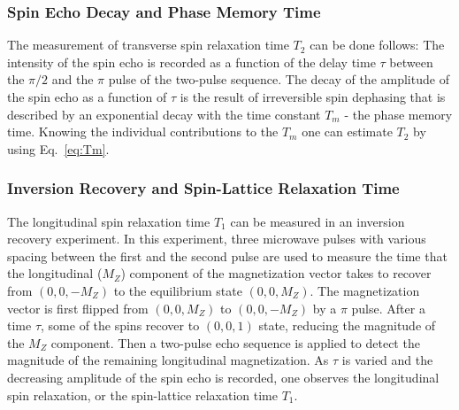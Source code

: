 \subsubsection{Spin Echo Decay and Phase Memory Time}
The measurement of transverse spin relaxation time $T_2$ can be done follows: The intensity of the spin echo is recorded as a function of the delay time $\tau$ between the $\pi/2$ and the $\pi$ pulse of the two-pulse sequence. The decay of the amplitude of the spin echo as a function of $\tau$ is the result of irreversible spin dephasing that is described by an exponential decay with the time constant $T_m$ - the phase memory time. Knowing the individual contributions to the $T_m$ one can estimate $T_2$ by using Eq.~\ref{eq:Tm}.

\subsubsection{Inversion Recovery and Spin-Lattice Relaxation Time}
The longitudinal spin relaxation time $T_1$ can be measured in an inversion recovery experiment. In this experiment, three microwave pulses with various spacing between the first and the second pulse are used to measure the time that the longitudinal ($M_Z$) component of the magnetization vector takes to recover from $(0,0,-M_Z)$ to the equilibrium state $(0,0,M_Z)$. The magnetization vector is first flipped from $(0,0,M_Z)$ to $(0,0,-M_Z)$ by a $\pi$ pulse. After a time $\tau$, some of the spins recover to $(0,0,1)$ state, reducing the magnitude of the $M_Z$ component. Then a two-pulse echo sequence is applied to detect the magnitude of the remaining longitudinal magnetization. As $\tau$ is varied and the decreasing amplitude of the spin echo is recorded, one observes the longitudinal spin relaxation, or the spin-lattice relaxation time $T_1$.